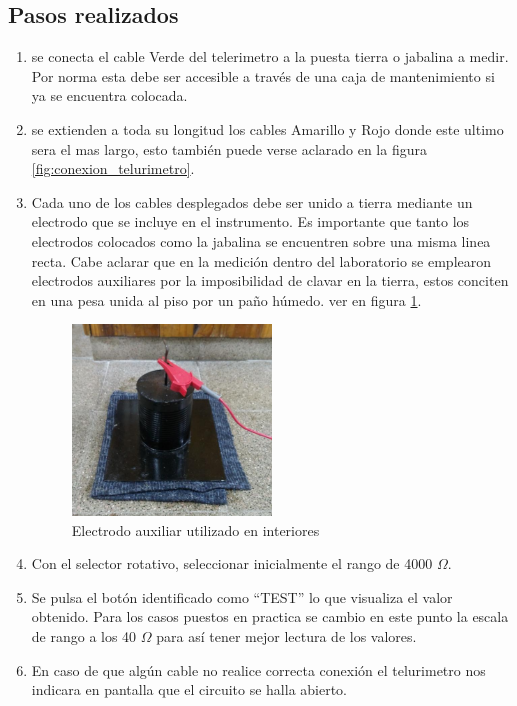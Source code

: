 \documentclass[12pt, letterpaper]{article}
\begin{document}
\subsection{Pasos realizados}
\begin{enumerate}
    \item se conecta el cable Verde del telerimetro a la puesta tierra o jabalina a medir. Por norma esta debe ser accesible a través de una caja de mantenimiento si ya se encuentra colocada.
    \item se extienden a toda su longitud  los cables Amarillo y Rojo donde este ultimo sera el mas largo, esto también puede verse aclarado en la figura \ref{fig:conexion_telurimetro}. 
    \item Cada uno de los cables desplegados debe ser unido a tierra mediante un electrodo que se incluye en el instrumento. Es importante que tanto los electrodos colocados como la jabalina se encuentren sobre una misma linea recta. Cabe aclarar que en la medición dentro del laboratorio se emplearon electrodos auxiliares por la imposibilidad de clavar en la tierra, estos conciten en una pesa unida al piso por un paño húmedo.  ver en  figura  \ref{fig:electrodo}.
\begin{figure}[H]
	\centering
	\includegraphics[width=0.5\textwidth]{imagenes/electrodo_aux.png}
	\caption{Electrodo auxiliar utilizado en interiores}
	\label{fig:electrodo}
\end{figure}
\item Con el selector rotativo, seleccionar inicialmente el rango de 4000 $\Omega$.
\item Se pulsa el botón identificado como “TEST” lo que visualiza el valor obtenido. Para los casos puestos en practica se cambio en este punto la escala de rango a los 40 $\Omega$ para así tener mejor lectura de los valores.
\item En caso de que algún cable no realice correcta conexión el telurimetro nos indicara en pantalla que el circuito se halla abierto.
\end{enumerate}
\singlespacing
\end{document}
